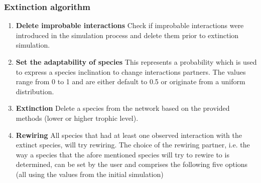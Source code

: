 \documentclass[12pt,a4paper]{article}
\begin{document}
\subsubsection{Extinction algorithm} \label{subsec:extc_alg}
\begin{enumerate} 
	\item \textbf{Delete improbable interactions} {\small Check if improbable interactions were introduced in the simulation process and delete them prior to extinction simulation.}
	\item \textbf{Set the adaptability of species} {\small This represents a probability which is used to express a species inclination to change interactions partners. The values range from 0 to 1 and are either default to 0.5 or originate from a uniform distribution.}
	\item \label{itm:etxc} \textbf{Extinction} {\small Delete a species from the network based on the provided methods (lower or higher trophic level).}
	\item \label{itm:rew} \textbf{Rewiring} {\small All species that had at least one observed interaction with the extinct species, will try rewiring. The choice of the rewiring partner, i.e. the way a species that the afore mentioned species will try to rewire to is determined, can be set by the user and comprises the following five options (all using the values from the initial simulation)}

\end{enumerate}
\end{document}

